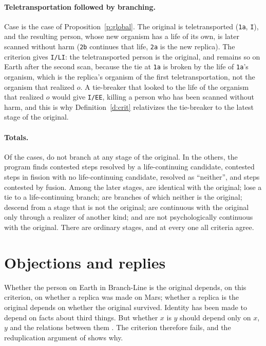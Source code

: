 \documentclass{situationist-preprint}
\begin{document}
\paragraph{Teletransportation followed by branching.} Case \caseTeleBranch{} is the case of Proposition~\ref{p:global}. The original is teletransported (\texttt{1a}, \texttt{I}), and the resulting person, whose new organism has a life of its own, is later scanned without harm (\texttt{2b} continues that life, \texttt{2a} is the new replica). The criterion gives \texttt{I/LI}: the teletransported person is the original, and remains so on Earth after the second scan, because the tie at \texttt{1a} is broken by the life of \texttt{1a}'s organism, which is the replica's organism of the first teletransportation, not the organism that realized $o$. A tie-breaker that looked to the life of the organism that realized $o$ would give \texttt{I/EE}, killing a person who has been scanned without harm, and this is why Definition~\ref{d:crit} relativizes the tie-breaker to the latest stage of the original.

\paragraph{Totals.} Of the \stcases{} cases, \stclsN{} do not branch at any stage of the original. In the others, the program finds \stcontestB{} contested steps resolved by a life-continuing candidate, \stcontestE{} contested steps in fission with no life-continuing candidate, resolved as \enquote{neither}, and \stcontestF{} steps contested by fusion. Among the \ststages{} later stages, \stvI{} are identical with the original; \stvL{} lose a tie to a life-continuing branch; \stvE{} are branches of which neither is the original; \stvD{} descend from a stage that is not the original; \stvU{} are continuous with the original only through a realizer of another kind; and \stvN{} are not psychologically continuous with the original. There are \stordstages{} ordinary stages, and at every one all criteria agree.

\section{Objections and replies}\label{s:objections}

\begin{objection}\label{o:onlyxy}
Whether the person on Earth in Branch-Line is the original depends, on this criterion, on whether a replica was made on Mars; whether a replica is the original depends on whether the original survived. Identity has been made to depend on facts about third things. But whether $x$ is $y$ should depend only on $x$, $y$ and the relations between them \citep{Wiggins1980,Noonan1985}. The criterion therefore fails, and the reduplication argument of \citet{Williams1957} shows why.
\end{objection}
\end{document}
